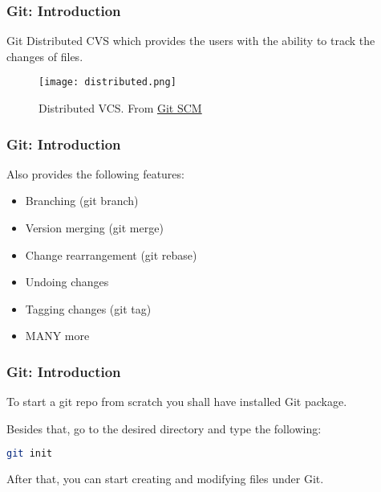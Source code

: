 \begin{frame}

\frametitle{Git: Introduction}

\begin{block}{Git}
Distributed CVS which provides the users with the ability to track the changes of files. 
\end{block}

\begin{figure}
\texttt{[image: distributed.png]}
\caption{Distributed VCS. From \href{https://git-scm.com/book/en/v2/Getting-Started-About-Version-Control}{Git SCM}}
\label{fig:distributed}
\end{figure}

\end{frame}

\begin{frame}

\frametitle{Git: Introduction}

Also provides the following features:
\begin{itemize}
\item Branching (git branch)
\item Version merging (git merge)
\item Change rearrangement (git rebase)
\item Undoing changes
\item Tagging changes (git tag)
\item MANY more
\end{itemize}

\end{frame}

\begin{frame}[fragile]

\frametitle{Git: Introduction}

To start a git repo from scratch you shall have installed Git package. 

Besides that, go to the desired directory and type the following:

\begin{lstlisting}[language=Bash]
git init
\end{lstlisting}


After that, you can start creating and modifying files under Git.
\end{frame}
